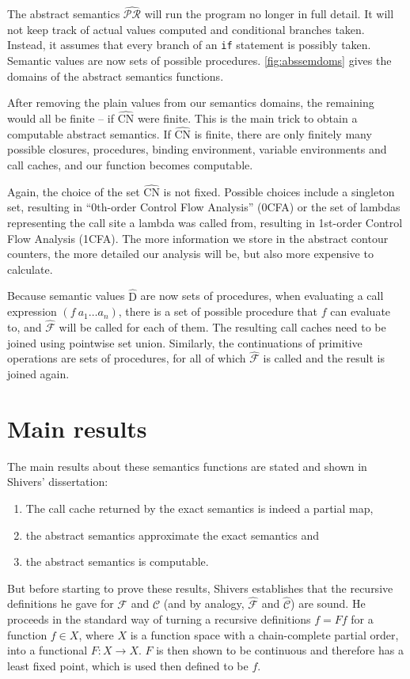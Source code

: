 \documentclass[a4paper,halfparskip,DIV=10,11pt]{scrbook}
\newcommand{\C}{\mathcal C}
\newcommand{\F}{\mathcal F}
\newcommand{\aC}{\widehat{\mathcal C}}
\newcommand{\aF}{\widehat{\mathcal F}}
\newcommand{\aPR}{\widehat{\mathcal {PR}}}
\begin{document}
The abstract semantics $\aPR$ will run the program no longer in full detail. It will not keep track of actual values computed and conditional branches taken. Instead, it assumes that every branch of an \texttt{if} statement is possibly taken. Semantic values are now sets of possible procedures. \vref{fig:abssemdoms} gives the domains of the abstract semantics functions. 

After removing the plain values from our semantics domains, the remaining would all be finite – if  $\widehat{\text{CN}}$ were finite. This is the main trick to obtain a computable abstract semantics. If $\widehat{\text{CN}}$ is finite, there are only finitely many possible closures, procedures, binding environment, variable environments and call caches, and our function becomes computable.

Again, the choice of the set $\widehat{\text{CN}}$ is not fixed. Possible choices include a singleton set, resulting in “0th-order Control Flow Analysis” (0CFA) or the set of lambdas representing the call site a lambda was called from, resulting in 1st-order Control Flow Analysis (1CFA). The more information we store in the abstract contour counters, the more detailed our analysis will be, but also more expensive to calculate.

Because semantic values $\widehat{\text{D}}$ are now sets of procedures, when evaluating a call expression $(f\ a_1\ldots a_n)$, there is a set of possible procedure that $f$ can evaluate to, and $\aF$ will be called for each of them. The resulting call caches need to be joined using pointwise set union. Similarly, the continuations of primitive operations are sets of procedures, for all of which $\aF$ is called and the result is joined again.

\section{Main results}

The main results about these semantics functions are stated and shown in Shivers’ dissertation:
\begin{enumerate}
\item The call cache returned by the exact semantics is indeed a partial map,
\item the abstract semantics approximate the exact semantics and
\item the abstract semantics is computable.
\end{enumerate}

But before starting to prove these results, Shivers establishes that the recursive definitions he gave for $\F$ and $\C$ (and by analogy, $\aF$ and $\aC$) are sound. He proceeds in the standard way of turning a recursive definitions $f = F f$ for a function $f\in X$, where $X$ is a function space with a chain-complete partial order, into a functional $F\colon X \to X$. $F$ is then shown to be continuous and therefore has a least fixed point, which is used then defined to be $f$.
  
\end{document}
